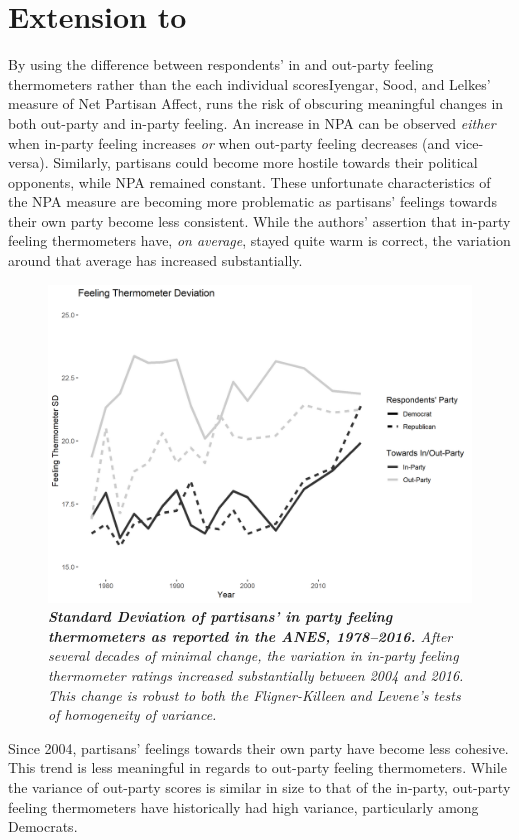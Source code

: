\documentclass[12pt]{article}
\begin{document}
\section{Extension to \citet{iyengar2012affect} }
By using the difference between respondents' in and out-party feeling thermometers rather than the each individual scoresIyengar, Sood, and Lelkes' measure of Net Partisan Affect, runs the risk of obscuring meaningful changes in both out-party and in-party feeling. An increase in NPA can be observed \textit{either} when in-party feeling increases \textit{or} when out-party feeling decreases (and vice-versa). Similarly, partisans could become more hostile towards their political opponents, while NPA remained constant. These unfortunate characteristics of the NPA measure are becoming more problematic as partisans' feelings towards their own party become less consistent. While the authors' assertion that in-party feeling thermometers have, \textit{on average}, stayed quite warm is correct, the variation around that average has increased substantially.

\begin{figure}[H]
\center\includegraphics[width=5in]{cdf-sd.png}
\caption{\label{fig:cdf-sd} \textit{\textbf{Standard Deviation of partisans' in party feeling thermometers as reported in the ANES, 1978--2016.} After several decades of minimal change, the variation in in-party feeling thermometer ratings increased substantially between 2004 and 2016. This change is robust to both the Fligner-Killeen and Levene's tests of homogeneity of variance.}}
\end{figure}

Since 2004, partisans' feelings towards their own party have become less cohesive. This trend is less meaningful in regards to out-party feeling thermometers. While  the variance of out-party scores is similar in size to that of the in-party, out-party feeling thermometers have historically had high variance, particularly among Democrats.
\end{document}

